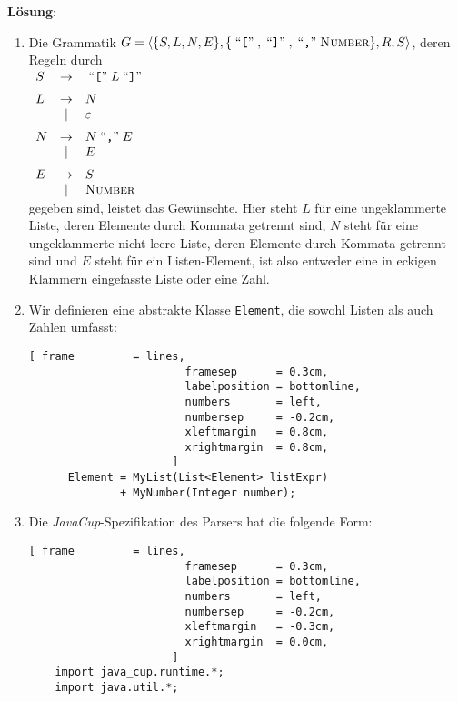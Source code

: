 \documentclass{article}
\newcommand{\solution}{
\vspace*{0.3cm}

\noindent
\textbf{L\"osung}: }
\newcommand{\quoted}[1]{\;\mbox{``\texttt{#1}''}\;}
\begin{document}
\solution
\begin{enumerate}
\item Die Grammatik 
      $G = \langle \{S,L,N,E\}, \{ \quoted{[},\quoted{]}, \quoted{,}\textsc{Number} \}, R, S \rangle$, 
      deren Regeln durch
      \\[0.2cm]
      \hspace*{1.3cm}
      $
      \begin{array}[t]{lcl}
        S & \rightarrow & \quoted{[} L \quoted{]}         \\[0.2cm]
        L & \rightarrow & N                               \\
          & \mid        & \varepsilon                     \\[0.2cm]
        N & \rightarrow & N \quoted{,} E                  \\
          & \mid        & E                               \\[0.2cm]
        E & \rightarrow & S                               \\
          & \mid        & \textsc{Number}                 \\
      \end{array}
      $
      \\[0.2cm]
      gegeben sind, leistet das Gew\"unschte.  Hier steht $L$ f\"ur eine ungeklammerte Liste, 
      deren Elemente durch Kommata
      getrennt sind,  $N$ steht f\"ur eine ungeklammerte nicht-leere Liste, deren Elemente durch Kommata getrennt
      sind und $E$ steht f\"ur ein Listen-Element, ist also entweder eine in eckigen Klammern
      eingefasste Liste oder eine Zahl.
\item Wir definieren eine abstrakte Klasse \texttt{Element}, die sowohl Listen als auch Zahlen
      umfasst:
      \begin{Verbatim}[ frame         = lines, 
                        framesep      = 0.3cm, 
                        labelposition = bottomline,
                        numbers       = left,
                        numbersep     = -0.2cm,
                        xleftmargin   = 0.8cm,
                        xrightmargin  = 0.8cm,
                      ]
      Element = MyList(List<Element> listExpr) 
              + MyNumber(Integer number);
      \end{Verbatim}
      \pagebreak

\item Die \textsl{JavaCup}-Spezifikation des Parsers hat die folgende Form:
      \begin{Verbatim}[ frame         = lines, 
                        framesep      = 0.3cm, 
                        labelposition = bottomline,
                        numbers       = left,
                        numbersep     = -0.2cm,
                        xleftmargin   = -0.3cm,
                        xrightmargin  = 0.0cm,
                      ]
    import java_cup.runtime.*;
    import java.util.*;
    

\end{Verbatim}
\end{enumerate}
\end{document}
